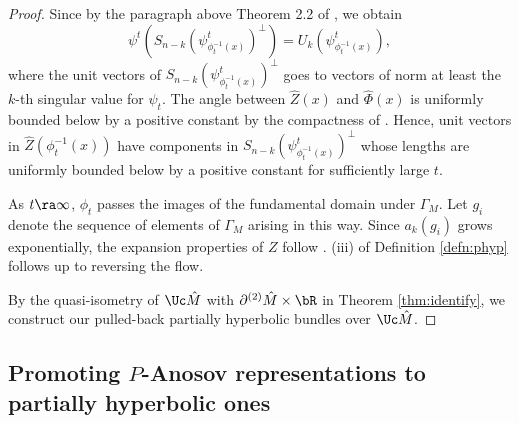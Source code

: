 \begin{proof}
	Since by the paragraph above Theorem 2.2 of \cite{BPS}, we obtain
	\[\psi^t(S_{n-k}(\psi^t_{\phi^{-1}_t(x)})^{\perp}) = U_k(\psi^t_{\phi^{-1}_t(x)}),\]
	where the unit vectors of $S_{n-k}(\psi^t_{\phi^{-1}_t(x)})^{\perp}$ goes to 
	vectors of norm at least the $k$-th singular value for $\psi_t$. 
		The angle between $\hat Z(x)$ and $\hat \Phi(x)$ is uniformly bounded below by 
a positive constant 
		by the compactness of . 
		Hence, unit vectors in $\hat Z({\phi^{-1}_t(x)})$ have 
		components in $S_{n-k}(\psi^t_{\phi^{-1}_t(x)})^\perp$ whose lengths are uniformly bounded below by a positive constant 
		for sufficiently large $t$. 

	As $t \ra \infty$, $\phi_t$ passes the images of the fundamental domain under $\Gamma_M$. 
	Let $g_i$ denote the sequence of elements of $\Gamma_M$ arising in this way. 
		Since $a_k(g_i)$ grows exponentially, the expansion properties of $Z$ follow
. 
	(iii) of  Definition \ref{defn:phyp} follows up to reversing the flow. 
	
			By the quasi-isometry of $\Uc \hat M$ with $\partial^{(2)}\hat M \times \bR$ in Theorem \ref{thm:identify},
	we construct our pulled-back partially hyperbolic bundles over $\Uc \hat M$.
%	
%	
%	
\end{proof} 



\subsection{Promoting $P$-Anosov representations to  
partially hyperbolic ones}
\label{sub:converse} 


